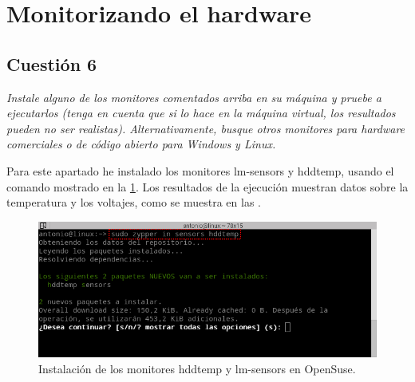 \section{Monitorizando el hardware}
\subsection{Cuestión 6}
\textit{Instale alguno de los monitores comentados arriba en su máquina y pruebe a ejecutarlos (tenga en cuenta que si lo hace en la máquina virtual, los resultados pueden no ser realistas). Alternativamente, busque otros monitores para hardware comerciales o de código abierto para Windows y Linux.}
\newline

Para este apartado he instalado los monitores lm-sensors y hddtemp, usando el comando mostrado en la \cref{fig13}. Los resultados de la ejecución muestran datos sobre la temperatura y los voltajes, como se muestra en las .

\begin{figure}[H]
  \begin{center}
    \includegraphics[width=1\textwidth]{imagenes/sensors}
    \caption{Instalación de los monitores hddtemp y lm-sensors en OpenSuse.}
    \label{fig13}
  \end{center}
\end{figure}

